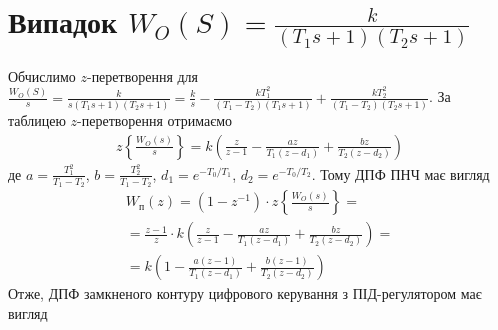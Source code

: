 \section{Випадок \texorpdfstring{$W_O(S) = \frac{k}{(T_1 s + 1)(T_2 s + 1)}$}{2}}
Обчислимо $z$-перетворення для $\frac{W_O(S)}{s} = \frac{k}{s(T_1 s + 1)(T_2 s + 1)} = 
\frac{k}{s} - \frac{k T_1^2}{(T_1 - T_2) (T_1 s + 1)} + \frac{k T_2^2}{(T_1 - T_2) (T_2 s + 1)}$.
За таблицею $z$-перетворення отримаємо
\begin{gather}
    z\left\{\frac{W_O(s)}{s} \right\} = 
    k \left(
        \frac{z}{z-1} - \frac{az}{T_1 (z - d_1)} +
        \frac{bz}{T_2 (z - d_2)}
    \right)
\end{gather}
де $a = \frac{T_1^2}{T_1 - T_2}$, $b = \frac{T_2^2}{T_1 - T_2}$,
$d_1 = e^{-T_0 / T_1}$, $d_2 = e^{-T_0 / T_2}$.
Тому ДПФ ПНЧ має вигляд
\begin{gather}
    W_{\text{п}}(z) = \left(1 - z^{-1}\right) \cdot z\left\{\frac{W_O(s)}{s} \right\} = 
    \nonumber \\ =
    \frac{z-1}{z} \cdot k \left(
        \frac{z}{z-1} - \frac{az}{T_1 (z - d_1)} +
        \frac{bz}{T_2 (z - d_2)}
    \right) = \nonumber \\ =
    k \left(
        1 - \frac{a(z-1)}{T_1 (z - d_1)} +
        \frac{b(z-1)}{T_2 (z - d_2)}
    \right)
\end{gather}
Отже, ДПФ замкненого контуру цифрового керування з ПІД-регулятором має вигляд
